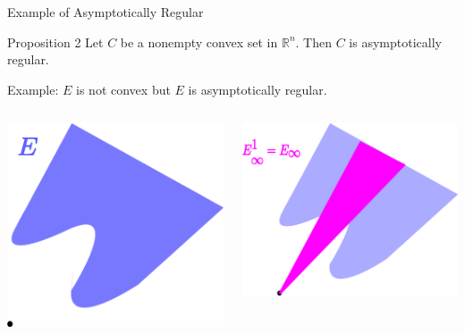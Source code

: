 \documentclass[aspectratio=169, dvipdfmx, 11pt]{beamer} %
\newcommand{\NDemenstionalRealEuclideanSpace}{\mathbb{R}^n}
\begin{document}
\begin{frame}{Example of Asymptotically Regular}
  \begin{block}{Proposition 2}
    Let $C$ be a nonempty convex set in $\NDemenstionalRealEuclideanSpace$. Then $C$ is asymptotically regular.
  \end{block}

  Example: $E$ is not convex but $E$ is asymptotically regular.

  \medskip

  \centering
  \begin{columns}
    \begin{column}{0.48\textwidth}
    \centering
    \includegraphics[keepaspectratio, scale=0.095]{figures/example_not_convex_asymptotically_regular_1.eps}
    \end{column}
    \pause
    \begin{column}{0.48\textwidth}
    \centering
    \includegraphics[keepaspectratio, scale=0.095]{figures/example_not_convex_asymptotically_regular_2.eps}

\end{column}
\end{columns}
\end{frame}
\end{document}
